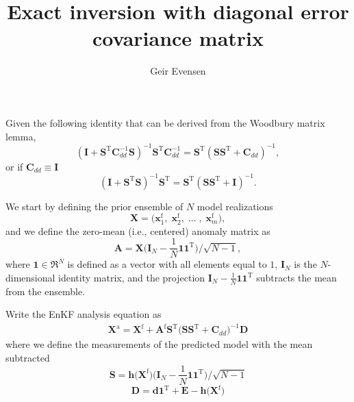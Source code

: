 \documentclass[11pt]{article}
\newcommand{\rmT}{\mathrm{T}}
\newcommand{\rmf}{\mathrm{f}}
\newcommand{\rma}{\mathrm{a}}
\newcommand{\bmEN}{\mathbf{1}}
\newcommand{\bIenena}{\bmI_N-\frac{1}{N} \bmEN\bmEN^\rmT}
\newcommand{\bIenen}{\Big(\bmI_N-\frac{1}{N} \bmEN\bmEN^\rmT\Big)}
\newcommand{\bmd}{{\mathbf{d}}}
\newcommand{\bmh}{{\mathbf{h}}}
\newcommand{\bmx}{{\mathbf{x}}}
\newcommand{\bmA}{{\mathbf{A}}}
\newcommand{\bmC}{{\mathbf{C}}}
\newcommand{\bmD}{{\mathbf{D}}}
\newcommand{\bmE}{{\mathbf{E}}}
\newcommand{\bmI}{{\mathbf{I}}}
\newcommand{\bmS}{{\mathbf{S}}}
\newcommand{\bmX}{{\mathbf{X}}}
\begin{document}
\title{Exact inversion with diagonal error covariance matrix}
\author{Geir Evensen}
\maketitle
Given the following identity that can be derived from the Woodbury matrix lemma,
%
\begin{equation}
 (\bmI + \bmS^\rmT \bmC_{dd}^{-1} \bmS )^{-1} \bmS^\rmT  \bmC_{dd}^{-1}   = \bmS^\rmT (\bmS \bmS^\rmT + \bmC_{dd})^{-1} , \label{eq:woodbury}
\end{equation}
%
or if $\bmC_{dd} \equiv \bmI$
%
\begin{equation}
 (\bmI + \bmS^\rmT \bmS )^{-1} \bmS^\rmT   = \bmS^\rmT (\bmS \bmS^\rmT + \bmI)^{-1} . \label{eq:woodbury2c}
\end{equation}
%

We start by defining the prior ensemble of $N$ model realizations
%
\begin{equation}
 \bmX = \Big( \bmx^\rmf_1  ,\; \bmx^\rmf_2 ,\; \ldots\; ,\;  \bmx^\rmf_m \Big) ,
\label{eq:X}
\end{equation}
%
and we define the zero-mean (i.e., centered) anomaly matrix as
%
\begin{equation}
 \bmA = \bmX \bIenen \big/\sqrt{N-1}   ,
\label{eq:X}
\end{equation}
%
where  $\bmEN \in \Re^{N}$ is defined as a vector with all elements equal to $1$, $\bmI_N$ is the $N$-dimensional identity matrix,
and the projection $\bIenena$ subtracts the mean from the ensemble.


Write the EnKF analysis equation as
%
\begin{align}
\bmX^\rma  = \bmX^\rmf  + \bmA^\rmf \bmS^\rmT \big(  \bmS \bmS^\rmT + \bmC_{dd} \big)^{-1} \bmD
\end{align}
%
where we define the measurements of the predicted model with the mean subtracted
%
\begin{equation}
 \bmS= \bmh\big(\bmX^\rmf\big) \bIenen \big/\sqrt{N-1} 
\label{eq:}
\end{equation}
%
%
\begin{equation}
 \bmD= \bmd \bmEN^\rmT  + \bmE - \bmh\big(\bmX^\rmf\big) 
\label{eq:}
\end{equation}
%
\end{document}
